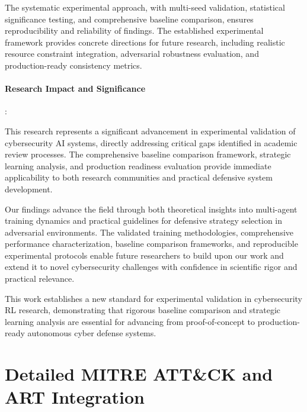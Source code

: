 \documentclass[12pt,oneside]{article}
\begin{document}
The systematic experimental approach, with multi-seed validation, statistical significance testing, and comprehensive baseline comparison, ensures reproducibility and reliability of findings. The established experimental framework provides concrete directions for future research, including realistic resource constraint integration, adversarial robustness evaluation, and production-ready consistency metrics.

\paragraph{Research Impact and Significance}:

This research represents a significant advancement in experimental validation of cybersecurity AI systems, directly addressing critical gaps identified in academic review processes. The comprehensive baseline comparison framework, strategic learning analysis, and production readiness evaluation provide immediate applicability to both research communities and practical defensive system development.

Our findings advance the field through both theoretical insights into multi-agent training dynamics and practical guidelines for defensive strategy selection in adversarial environments. The validated training methodologies, comprehensive performance characterization, baseline comparison frameworks, and reproducible experimental protocols enable future researchers to build upon our work and extend it to novel cybersecurity challenges with confidence in scientific rigor and practical relevance.

This work establishes a new standard for experimental validation in cybersecurity RL research, demonstrating that rigorous baseline comparison and strategic learning analysis are essential for advancing from proof-of-concept to production-ready autonomous cyber defense systems.






\appendix

\section{Detailed MITRE ATT\&CK and ART Integration}
\end{document}
